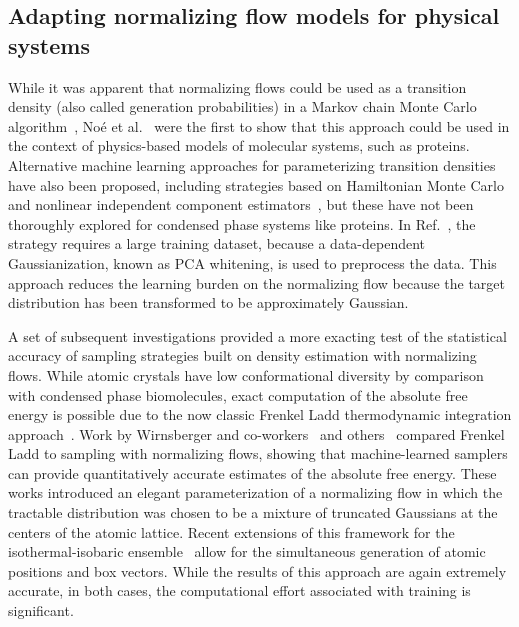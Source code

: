 \documentclass[11pt]{article}
\begin{document}
\subsection{Adapting normalizing flow models for physical systems}

While it was apparent that normalizing flows could be used as a transition density (also called generation probabilities) in a Markov chain Monte Carlo algorithm~\cite{rezende_variational_2015}, No\'{e} et al.~\cite{noe_boltzmann_2019} were the first to show that this approach could be used in the context of physics-based models of molecular systems, such as proteins.
Alternative machine learning approaches for parameterizing transition densities have also been proposed, including strategies based on Hamiltonian Monte Carlo~\cite{levy_generalizing_2018} and nonlinear independent component estimators~\cite{song_-nice-mc_2017}, but these have not been thoroughly explored for condensed phase systems like proteins. 
In Ref.~\cite{noe_boltzmann_2019}, the strategy requires a large training dataset, because a data-dependent Gaussianization, known as PCA whitening, is used to preprocess the data. 
This approach reduces the learning burden on the normalizing flow because the target distribution has been transformed to be approximately Gaussian. 

A set of subsequent investigations provided a more exacting test of the statistical accuracy of sampling strategies built on density estimation with normalizing flows. 
While atomic crystals have low conformational diversity by comparison with condensed phase biomolecules, exact computation of the absolute free energy is possible due to the now classic Frenkel Ladd thermodynamic integration approach~\cite{frenkel_new_1984}.  
Work by Wirnsberger and co-workers~\cite{wirnsberger_normalizing_2021, wirnsberger_estimating_2023} and others~\cite{ahmad_free_2021} compared Frenkel Ladd to sampling with normalizing flows, showing that machine-learned samplers can provide quantitatively accurate estimates of the absolute free energy.
These works introduced an elegant parameterization of a normalizing flow in which the tractable distribution was chosen to be a mixture of truncated Gaussians at the centers of the atomic lattice. 
Recent extensions of this framework for the isothermal-isobaric ensemble~\cite{wirnsberger_estimating_2023} allow for the simultaneous generation of atomic positions and box vectors.
While the results of this approach are again extremely accurate, in both cases, the computational effort associated with training is significant.
\end{document}
